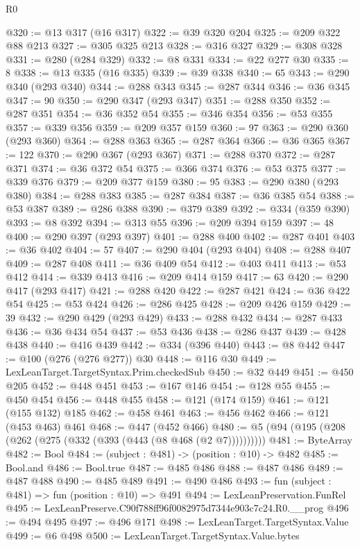 \begin{lexlean}{R0}
\begin{coremodule}
@320 := @13 @317 (@16 @317)
@322 := @39 @320 @204
@325 := @209 @322 @88 @213
@327 := @305 @325 @213
@328 := @316 @327
@329 := @308 @328
@331 := @280 (@284 @329)
@332 := @8 @331
@334 := @22 @277 @30
@335 := 8
@338 := @13 @335 (@16 @335)
@339 := @39 @338
@340 := 65
@343 := @290 @340 (@293 @340)
@344 := @288 @343
@345 := @287 @344
@346 := @36 @345
@347 := 90
@350 := @290 @347 (@293 @347)
@351 := @288 @350
@352 := @287 @351
@354 := @36 @352 @54
@355 := @346 @354
@356 := @53 @355
@357 := @339 @356
@359 := @209 @357 @159
@360 := 97
@363 := @290 @360 (@293 @360)
@364 := @288 @363
@365 := @287 @364
@366 := @36 @365
@367 := 122
@370 := @290 @367 (@293 @367)
@371 := @288 @370
@372 := @287 @371
@374 := @36 @372 @54
@375 := @366 @374
@376 := @53 @375
@377 := @339 @376
@379 := @209 @377 @159
@380 := 95
@383 := @290 @380 (@293 @380)
@384 := @288 @383
@385 := @287 @384
@387 := @36 @385 @54
@388 := @53 @387
@389 := @286 @388
@390 := @379 @389
@392 := @334 (@359 @390)
@393 := @8 @392
@394 := @313 @55
@396 := @209 @394 @159
@397 := 48
@400 := @290 @397 (@293 @397)
@401 := @288 @400
@402 := @287 @401
@403 := @36 @402
@404 := 57
@407 := @290 @404 (@293 @404)
@408 := @288 @407
@409 := @287 @408
@411 := @36 @409 @54
@412 := @403 @411
@413 := @53 @412
@414 := @339 @413
@416 := @209 @414 @159
@417 := 63
@420 := @290 @417 (@293 @417)
@421 := @288 @420
@422 := @287 @421
@424 := @36 @422 @54
@425 := @53 @424
@426 := @286 @425
@428 := @209 @426 @159
@429 := 39
@432 := @290 @429 (@293 @429)
@433 := @288 @432
@434 := @287 @433
@436 := @36 @434 @54
@437 := @53 @436
@438 := @286 @437
@439 := @428 @438
@440 := @416 @439
@442 := @334 (@396 @440)
@443 := @8 @442
@447 := @100 (@276 (@276 @277)) @30
@448 := @116 @30
@449 := LexLeanTarget.TargetSyntax.Prim.checkedSub
@450 := @32 @449
@451 := @450 @205
@452 := @448 @451
@453 := @167 @146
@454 := @128 @55
@455 := @450 @454
@456 := @448 @455
@458 := @121 (@174 @159)
@461 := @121 (@155 @132) @185
@462 := @458 @461
@463 := @456 @462
@466 := @121 (@453 @463) @461
@468 := @447 (@452 @466)
@480 := @5 (@94 (@195 (@208 (@262 (@275 (@332 (@393 (@443 (@8 @468 (@2 @7))))))))))
@481 := ByteArray
@482 := Bool
@484 := (subject : @481) -> (position : @10) -> @482
@485 := Bool.and
@486 := Bool.true
@487 := @485 @486
@488 := @487 @486
@489 := @487 @488
@490 := @485 @489
@491 := @490 @486
@493 := fun (subject : @481) => fun (position : @10) => @491
@494 := LexLeanPreservation.FunRel
@495 := LexLeanPreserve.C90f788ff96f0082975d7344e903c7c24.R0.__prog
@496 := @494 @495
@497 := @496 @171
@498 := LexLeanTarget.TargetSyntax.Value
@499 := @6 @498
@500 := LexLeanTarget.TargetSyntax.Value.bytes

\end{coremodule}
\end{lexlean}
